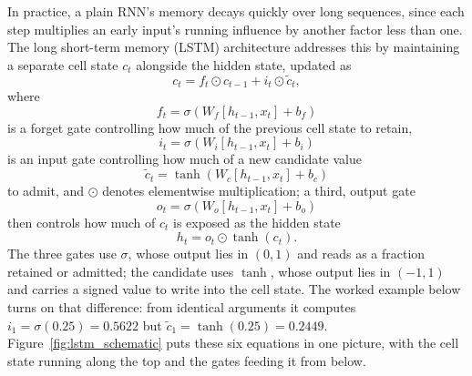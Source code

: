 \documentclass[../ai_in_finance]{subfiles}
\begin{document}
In practice, a plain RNN's memory decays quickly over long sequences, since each step multiplies an early input's running influence by another factor less than one. The long short-term memory (LSTM) architecture addresses this by maintaining a separate cell state $c_t$ alongside the hidden state, updated as
\begin{equation}
c_t = f_t \odot c_{t-1} + i_t \odot \tilde c_t,
\label{eq:altdata-lstm-cell}
\end{equation}
where
$$f_t = \sigma(W_f[h_{t-1},x_t] + b_f)$$
is a forget gate controlling how much of the previous cell state to retain,
$$i_t = \sigma(W_i[h_{t-1},x_t]+b_i)$$
is an input gate controlling how much of a new candidate value
$$\tilde c_t = \tanh(W_c[h_{t-1},x_t]+b_c)$$
to admit, and $\odot$ denotes elementwise multiplication; a third, output gate
$$o_t = \sigma(W_o[h_{t-1},x_t]+b_o)$$ then controls how much of $c_t$ is exposed as the hidden state
\begin{equation}
h_t = o_t \odot \tanh(c_t).
\label{eq:altdata-lstm-hidden}
\end{equation}
The three gates use $\sigma$, whose output lies in $(0,1)$ and reads as a fraction retained or admitted; the candidate uses $\tanh$, whose output lies in $(-1,1)$ and carries a signed value to write into the cell state. The worked example below turns on that difference: from identical arguments it computes $i_1 = \sigma(0.25) = 0.5622$ but $\tilde c_1 = \tanh(0.25) = 0.2449$.
Figure~\ref{fig:lstm_schematic} puts these six equations in one picture, with the cell state running along the top and the gates feeding it from below.
\end{document}
